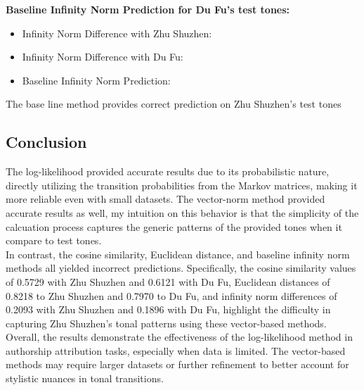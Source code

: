\documentclass[12pt]{article}
\begin{document}
\textbf{Baseline Infinity Norm Prediction for Du Fu's test tones:}
\begin{itemize}
    \item Infinity Norm Difference with Zhu Shuzhen:
    \item Infinity Norm Difference with Du Fu: 
    \item Baseline Infinity Norm Prediction: 
\end{itemize}

\noindent The base line method provides correct prediction on Zhu Shuzhen's test tones

\subsection*{Conclusion}

The log-likelihood provided accurate results due to its probabilistic nature, directly utilizing the transition probabilities from the Markov matrices, making it more reliable even with small datasets.
The vector-norm method provided accurate results as well, my intuition on this behavior is that the simplicity of the calcuation process captures the generic patterns of the provided tones when it compare to test tones.
\\
In contrast, the cosine similarity, Euclidean distance, and baseline infinity norm methods all yielded incorrect predictions. Specifically, the cosine similarity values of 0.5729 with Zhu Shuzhen and 0.6121 with Du Fu, Euclidean distances of 0.8218 to Zhu Shuzhen and 0.7970 to Du Fu, and infinity norm differences of 0.2093 with Zhu Shuzhen and 0.1896 with Du Fu, highlight the difficulty in capturing Zhu Shuzhen's tonal patterns using these vector-based methods.
\\
Overall, the results demonstrate the effectiveness of the log-likelihood method in authorship attribution tasks, especially when data is limited. The vector-based methods may require larger datasets or further refinement to better account for stylistic nuances in tonal transitions.
\end{document}
